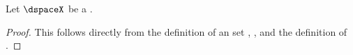 \begin{corollary}
\label{cor:dspace_open}
Let $\dspaceX$ be a .
\end{corollary}
\begin{proof}
This follows directly from the definition of an  set ,
, and the definition of  .
\end{proof}


